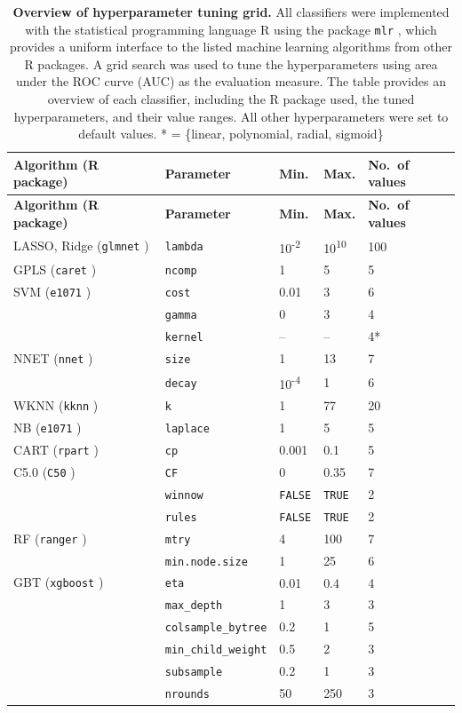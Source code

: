 \documentclass[
  oneside]{book}
\begin{document}
\begin{longtable}[]{@{}lllll@{}}
\caption{\label{tab:08-hyper-tab}\textbf{Overview of hyperparameter tuning grid.} All classifiers were implemented with the statistical programming language R \autocite{rlanguage} using the package \texttt{mlr} \autocite{Bischl:mlr2016}, which provides a uniform interface to the listed machine learning algorithms from other R packages. A grid search was used to tune the hyperparameters using area under the ROC curve (AUC) as the evaluation measure. The table provides an overview of each classifier, including the R package used, the tuned hyperparameters, and their value ranges. All other hyperparameters were set to default values. * = \{linear, polynomial, radial, sigmoid\}}\tabularnewline
\toprule
\textbf{Algorithm (R package)} & \textbf{Parameter} & \textbf{Min.} & \textbf{Max.} & \textbf{No.~of values} \\
\midrule
\endfirsthead
\toprule
\textbf{Algorithm (R package)} & \textbf{Parameter} & \textbf{Min.} & \textbf{Max.} & \textbf{No.~of values} \\
\midrule
\endhead
LASSO, Ridge (\texttt{glmnet} \autocite{lasso}) & \texttt{lambda} & 10\textsuperscript{-2} & 10\textsuperscript{10} & 100 \\
GPLS (\texttt{caret} \autocite{caret}) & \texttt{ncomp} & 1 & 5 & 5 \\
SVM (\texttt{e1071} \autocite{e1071}) & \texttt{cost} & 0.01 & 3 & 6 \\
& \texttt{gamma} & 0 & 3 & 4 \\
& \texttt{kernel} & -- & -- & 4* \\
NNET (\texttt{nnet} \autocite{nnet}) & \texttt{size} & 1 & 13 & 7 \\
& \texttt{decay} & 10\textsuperscript{-4} & 1 & 6 \\
WKNN (\texttt{kknn} \autocite{Hechenbichler:wknn2004}) & \texttt{k} & 1 & 77 & 20 \\
NB (\texttt{e1071} \autocite{e1071}) & \texttt{laplace} & 1 & 5 & 5 \\
CART (\texttt{rpart} \autocite{rpart}) & \texttt{cp} & 0.001 & 0.1 & 5 \\
C5.0 (\texttt{C50} \autocite{c50}) & \texttt{CF} & 0 & 0.35 & 7 \\
& \texttt{winnow} & \texttt{FALSE} & \texttt{TRUE} & 2 \\
& \texttt{rules} & \texttt{FALSE} & \texttt{TRUE} & 2 \\
RF (\texttt{ranger} \autocite{ranger}) & \texttt{mtry} & 4 & 100 & 7 \\
& \texttt{min.node.size} & 1 & 25 & 6 \\
GBT (\texttt{xgboost} \autocite{xgboost}) & \texttt{eta} & 0.01 & 0.4 & 4 \\
& \texttt{max\_depth} & 1 & 3 & 3 \\
& \texttt{colsample\_bytree} & 0.2 & 1 & 5 \\
& \texttt{min\_child\_weight} & 0.5 & 2 & 3 \\
& \texttt{subsample} & 0.2 & 1 & 3 \\
& \texttt{nrounds} & 50 & 250 & 3 \\
\bottomrule
\end{longtable}
\end{document}
